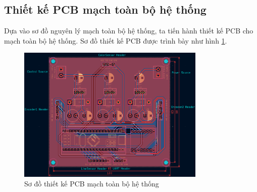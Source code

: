             \subsection{Thiết kế PCB mạch toàn bộ hệ thống}
                \hspace*{0.6cm}Dựa vào sơ đồ nguyên lý mạch toàn bộ hệ thống, ta tiến hành thiết kế PCB cho mạch toàn bộ hệ thống. Sơ đồ thiết kế PCB được trình bày như hình \ref{fig:4-18}.
                \begin{figure}[H]
                    \centering
                    \includegraphics[width=0.8\textwidth]{pictures/chapter4/c4_p15_PCB.png}
                    \caption{Sơ đồ thiết kế PCB mạch toàn bộ hệ thống}
                    \label{fig:4-18}
                \end{figure}
            
                